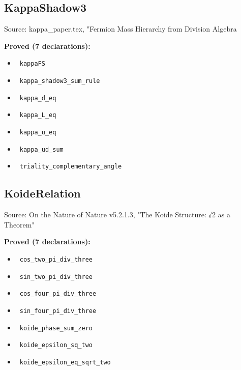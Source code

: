 \documentclass{report}
\theoremstyle{definition}
\begin{document}
\begin{itemize}
\begin{itemize}
\subsection{KappaShadow3}
Source: kappa\_paper.tex, "Fermion Mass Hierarchy from Division Algebra

\noindent\textbf{Proved (7 declarations):}
\begin{itemize}
  \item {}\leanok\ \texttt{kappaFS}
  \item {}\leanok\ \texttt{kappa\_shadow3\_sum\_rule}
  \item {}\leanok\ \texttt{kappa\_d\_eq}
  \item {}\leanok\ \texttt{kappa\_L\_eq}
  \item {}\leanok\ \texttt{kappa\_u\_eq}
  \item {}\leanok\ \texttt{kappa\_ud\_sum}
  \item {}\leanok\ \texttt{triality\_complementary\_angle}
\end{itemize}

\subsection{KoideRelation}
Source: On the Nature of Nature v5.2.1.3, "The Koide Structure: √2 as a Theorem"

\noindent\textbf{Proved (7 declarations):}
\begin{itemize}
  \item {}\leanok\ \texttt{cos\_two\_pi\_div\_three}
  \item {}\leanok\ \texttt{sin\_two\_pi\_div\_three}
  \item {}\leanok\ \texttt{cos\_four\_pi\_div\_three}
  \item {}\leanok\ \texttt{sin\_four\_pi\_div\_three}
  \item {}\leanok\ \texttt{koide\_phase\_sum\_zero}
  \item {}\leanok\ \texttt{koide\_epsilon\_sq\_two}
  \item {}\leanok\ \texttt{koide\_epsilon\_eq\_sqrt\_two}
\end{itemize}


\end{itemize}
\end{itemize}
\end{document}
